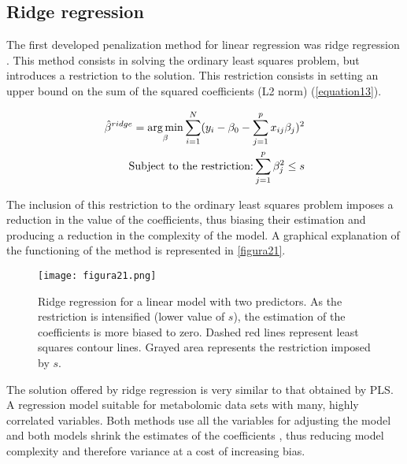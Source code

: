 \subsection{Ridge regression}
The first developed penalization method for linear regression was ridge regression \parencite{hoerl1970ridge}. This method consists in solving the ordinary least squares problem, but introduces a restriction to the solution. This restriction consists in setting an upper bound on the sum of the squared coefficients (L2 norm) (\autoref{equation13}).

\begin{equation}
\label{equation13}
\begin{split}
\hat{\beta}^{ridge}=\operatorname*{arg\,min}_\beta \sum\limits_{i=1}^N (y_{i}-\beta_{0}-\sum\limits_{j=1}^p x_{ij}\beta_{j})^{2} \\
\textrm{Subject to the restriction:}  \sum\limits_{j=1}^p \beta_{j}^2\leq s
\end{split}
\end{equation}

The inclusion of this restriction to the ordinary least squares problem imposes a reduction in the value of the coefficients, thus biasing their estimation and producing a reduction in the complexity of the model. A graphical explanation of the functioning of the method is represented in \autoref{figura21}.

\begin{figure}[hbtp]
\centering
\texttt{[image: figura21.png]}
\caption[Ridge regression for a linear model with two predictors]{Ridge regression for a linear model with two predictors. As the restriction is intensified (lower value of $s$), the estimation of the coefficients is more biased to zero. Dashed red lines represent least squares contour lines. Grayed area represents the restriction imposed by $s$.}
\label{figura21}
\end{figure}

The solution offered by ridge regression is very similar to that obtained by PLS. A regression model suitable for metabolomic data sets with many, highly correlated variables. Both methods use all the variables for adjusting the model and both models shrink the estimates of the coefficients \parencite{de1995pls}, thus reducing model complexity and therefore variance at a cost of increasing bias.

